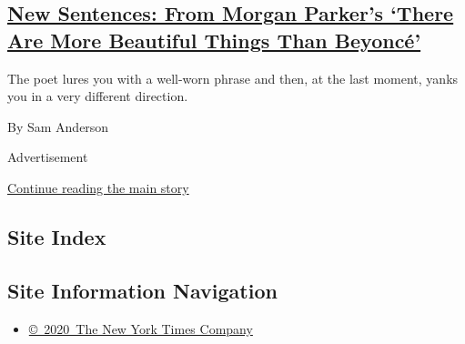 \begin{enumerate}
  \hypertarget{new-sentences-from-morgan-parkers-there-are-more-beautiful-things-than-beyoncuxe9}{%
  \subsection{\texorpdfstring{\href{/2018/03/20/magazine/new-sentences-from-morgan-parkers-there-are-more-beautiful-things-than-beyonce.html}{New
  Sentences: From Morgan Parker's `There Are More Beautiful Things Than
  Beyoncé'}}{New Sentences: From Morgan Parker's `There Are More Beautiful Things Than Beyoncé'}}\label{new-sentences-from-morgan-parkers-there-are-more-beautiful-things-than-beyoncuxe9}}

  The poet lures you with a well-worn phrase and then, at the last
  moment, yanks you in a very different direction.

  By Sam Anderson
\end{enumerate}

Advertisement

\protect\hyperlink{after-mid1}{Continue reading the main story}

\hypertarget{site-index}{%
\subsection{Site Index}\label{site-index}}

\hypertarget{site-information-navigation}{%
\subsection{Site Information
Navigation}\label{site-information-navigation}}

\begin{itemize}
\tightlist
\item
  \href{https://help.nytimes3xbfgragh.onion/hc/en-us/articles/115014792127-Copyright-notice}{©~2020~The
  New York Times Company}
\end{itemize}

